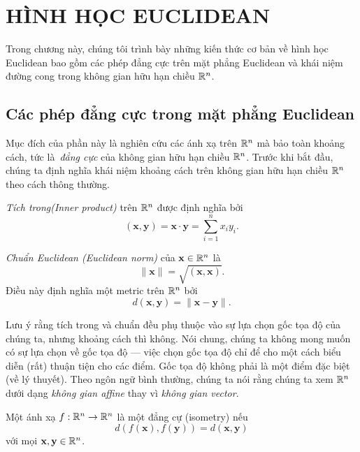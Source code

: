 \chapter{HÌNH HỌC EUCLIDEAN}

Trong chương này, chúng tôi trình bày những kiến thức cơ bản về hình học Euclidean bao gồm các phép đẳng cực trên mặt phẳng Euclidean và khái niệm đường cong trong không gian hữu hạn chiều $\mathbb{R}^n$.

\section{Các phép đẳng cực trong mặt phẳng Euclidean}

Mục đích của phần này là nghiên cứu các ánh xạ trên $\mathbb{R}^n$ mà bảo toàn khoảng cách, tức là\ \emph{đẳng cực} của không gian hữu hạn chiều $\mathbb{R}^n$. Trước khi bắt đầu, chúng ta định nghĩa khái niệm khoảng cách trên không gian hữu hạn chiều $\mathbb{R}^n$ theo cách thông thường.

\begin{defi}
  \emph{Tích trong(Inner product)} trên $\mathbb{R}^n$ được định nghĩa bởi
  \[
    (\mathbf{x}, \mathbf{y}) = \mathbf{x}\cdot \mathbf{y} = \sum_{i = 1}^n x_i y_i.
  \]
\end{defi}

\begin{defi}
  \emph{Chuẩn Euclidean (Euclidean norm)} của $\mathbf{x} \in \mathbb{R}^n$ là
  \[
    \|\mathbf{x}\| = \sqrt{(\mathbf{x}, \mathbf{x})}.
  \]
  Điều này định nghĩa một metric trên $\mathbb{R}^n$ bởi
  \[
    d(\mathbf{x}, \mathbf{y}) = \|\mathbf{x} - \mathbf{y}\|.
  \]
\end{defi}

Lưu ý rằng tích trong và chuẩn đều phụ thuộc vào sự lựa chọn gốc tọa độ của chúng ta, nhưng khoảng cách thì không. Nói chung, chúng ta không mong muốn có sự lựa chọn về gốc tọa độ --- việc chọn gốc tọa độ chỉ để cho một cách biểu diễn (rất) thuận tiện cho các điểm. Gốc tọa độ không phải là một điểm đặc biệt (về lý thuyết). Theo ngôn ngữ bình thường, chúng ta nói rằng chúng ta xem $\mathbb{R}^n$ dưới dạng \emph{không gian affine} thay vì \emph{không gian vector}.

\begin{defi}
  Một ánh xạ $f: \mathbb{R}^n \to \mathbb{R}^n$ là một đẳng cự (isometry) nếu
  \[
    d(f(\mathbf{x}), f(\mathbf{y})) = d(\mathbf{x}, \mathbf{y})
  \]
  với mọi $\mathbf{x}, \mathbf{y} \in \mathbb{R}^n$.
\end{defi}

